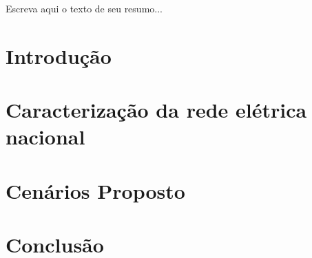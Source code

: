 \documentclass[capchap,sumarioincompleto,a4paper,12pt,ruledheader,normaltoc]{utfprtex}%
\begin{document}
\capa%
\newpage%
\newpage%


\begin{Resumo}
Escreva aqui o texto de seu resumo... 
\utfprTeX
\end{Resumo}

\listadefiguras

\listadetabelas


\listadesimbolos

\sumario

\chapter{Introdução} 
	

\chapter{Caracterização da rede elétrica nacional} 
	

\chapter{Cenários Proposto}
	

%

%

%

\chapter{Conclusão} 



\end{document}
